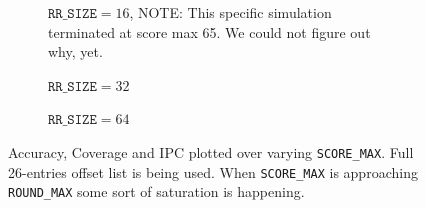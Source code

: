 \documentclass[conference]{IEEEtran}
\begin{document}
\begin{figure}
     \centering
     \begin{subfigure}[b]{1.0\columnwidth}
         \centering
         \resizebox{1.0\columnwidth}{!}{}
         \caption{$\texttt{RR\_SIZE} = 16$, NOTE: This specific simulation terminated at score max 65. We could not figure out why, yet.}
         \label{subfig:RR=16_offsets=26}
     \end{subfigure}
     \vfill
     \begin{subfigure}[b]{1.0\columnwidth}
         \centering
         \resizebox{1.0\columnwidth}{!}{}
         \caption{$\texttt{RR\_SIZE} = 32$}
         \label{subfig:RR=32_offsets=26}
     \end{subfigure}
     \vfill
     \begin{subfigure}[b]{1.0\columnwidth}
         \centering
         \resizebox{1.0\columnwidth}{!}{}
         \caption{$\texttt{RR\_SIZE} = 64$}
         \label{subfig:RR=64_offsets=26}
     \end{subfigure}
     \caption{Accuracy, Coverage and IPC plotted over varying \texttt{SCORE\_MAX}. Full 26-entries offset list is being used. When \texttt{SCORE\_MAX} is approaching \texttt{ROUND\_MAX} some sort of saturation is happening.}
     \label{fig:accuracy_coverage_ipc_full_offset_list_rr_16_32_64}
\end{figure}
\end{document}

